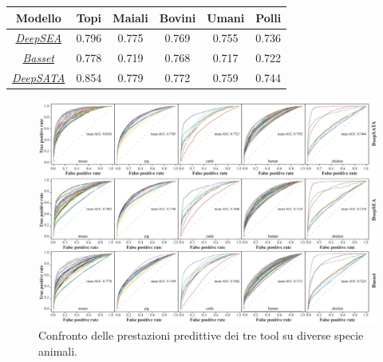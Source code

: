 \begin{table}[!h]
    \centering
    \renewcommand{\arraystretch}{2}
    \begin{tabular}{|c|c|c|c|c|c|} %
        \hline %
        \textbf{Modello} & \textbf{Topi} & \textbf{Maiali} & \textbf{Bovini} & \textbf{Umani} & \textbf{Polli}\\ 
        \hline\hline %
        \hyperref[sec:DeepSEA]{\textsl{DeepSEA}} & 0.796 & 0.775 & 0.769 & 0.755 & 0.736 \\ 
        \hyperref[sec:Basset]{\textsl{Basset}} & 0.778 & 0.719 & 0.768 & 0.717 & 0.722 \\ 
        \hyperref[sec:DeepSATA]{\textsl{DeepSATA}} & 0.854 & 0.779 & 0.772 & 0.759 & 0.744 \\ 
        \hline
    \end{tabular}
    \renewcommand{\arraystretch}{1}
\end{table}

\begin{figure}[!b]
    \centering
    \includegraphics[width=1\textwidth]{assets/imgs/comparison.jpg}
    \caption[Confronto delle prestazioni predittive dei tre tool su diverse specie animali.]{Confronto delle prestazioni predittive dei tre tool su diverse specie animali.}\label{fig:comparison}
\end{figure}


